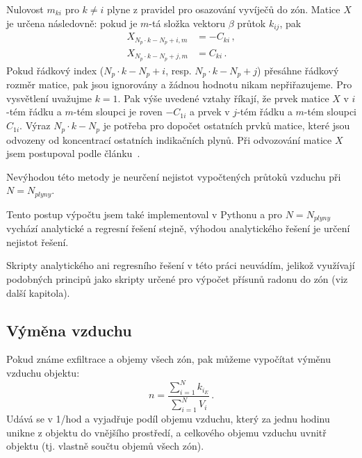 Nulovost $m_{ki}$ pro $k\neq i$ plyne z pravidel pro osazování vyvíječů do zón. Matice $X$ je určena následovně: pokud je $m$-tá složka vektoru $\beta$ průtok $k_{ij}$, pak 
\begin{align}
    X_{N_p\cdot k-N_p+i,m}&=-C_{ki}\,,\\
    X_{N_p\cdot k-N_p+j,m}&=C_{ki}\,.
\end{align}
Pokud řádkový index ($N_p\cdot k-N_p+i$, resp. $N_p\cdot k-N_p+j$) přesáhne řádkový rozměr matice, pak jsou ignorovány a žádnou hodnotu nikam nepřiřazujeme. Pro vysvětlení uvažujme $k=1$. Pak výše uvedené vztahy říkají, že prvek matice $X$ v $i$-tém řádku a $m$-tém sloupci je roven $-C_{1i}$ a prvek v $j$-tém řádku a $m$-tém sloupci $C_{1i}$. Výraz $N_p\cdot k-N_p$ je potřeba pro dopočet ostatních prvků matice, které jsou odvozeny od koncentrací ostatních indikačních plynů. Při odvozování matice $X$ jsem postupoval podle článku~\cite{japonci2}.

Nevýhodou této metody je neurčení nejistot vypočtených průtoků vzduchu při $N=N_{plyny}$. 

Tento postup výpočtu jsem také implementoval v Pythonu a pro $N=N_{plyny}$ vychází analytické a regresní řešení stejně, výhodou analytického řešení je určení nejistot řešení. 

Skripty analytického ani regresního řešení v této práci neuvádím, jelikož využívají podobných principů jako skripty určené pro výpočet přísunů radonu do zón (viz další kapitola).

\subsection{Výměna vzduchu}
Pokud známe exfiltrace a objemy všech zón, pak můžeme vypočítat výměnu vzduchu objektu:
\begin{equation}
    n=\frac{\sum_{i=1}^N k_{i_E}}{\sum_{i=1}^N V_i}\,.
    \label{eq:prutoky_n}
\end{equation}
Udává se v \si{1/hod} a vyjadřuje podíl objemu vzduchu, který za jednu hodinu unikne z objektu do vnějšího prostředí, a celkového objemu vzduchu uvnitř objektu (tj. vlastně součtu objemů všech zón).
